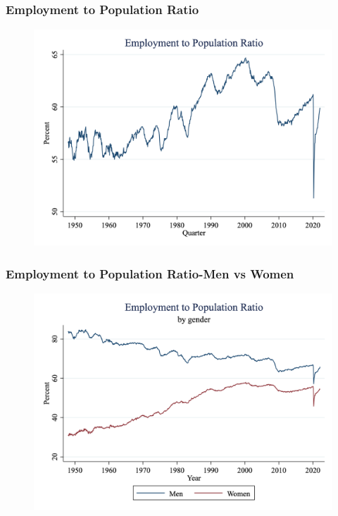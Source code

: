 \documentclass{beamer}
\begin{document}
\begin{frame}
\frametitle[alignment=center]{Employment to Population Ratio}
\begin{figure}
\centering
\includegraphics[scale=0.25]{Figures/EmPop1.png}
\end{figure}
\end{frame}

\begin{frame}
\frametitle[alignment=center]{Employment to Population Ratio-Men vs Women}
\begin{figure}
\centering
\includegraphics[scale=0.25]{Figures/EmPop2.png}
\end{figure}
\end{frame}
\end{document}
